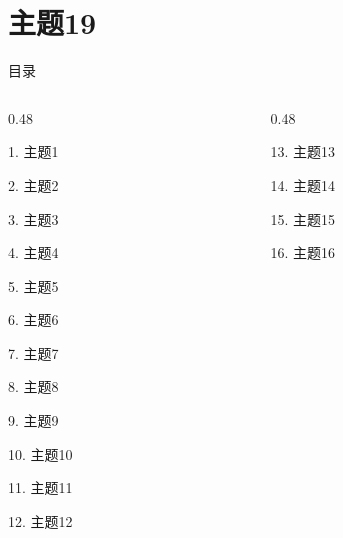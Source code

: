 \documentclass[aspectratio=169,10pt,fontset=fandol]{ctexbeamer}
\begin{document}
\section{主题19}
\begin{frame}[t,fragile]{目录}
\small
\begin{columns}[T,onlytextwidth]
\begin{column}{0.48\textwidth}
{\color{black}\small 1. 主题1\par}\vspace{0.22em}
{\color{black}\small 2. 主题2\par}\vspace{0.22em}
{\color{black}\small 3. 主题3\par}\vspace{0.22em}
{\color{black}\small 4. 主题4\par}\vspace{0.22em}
{\color{black}\small 5. 主题5\par}\vspace{0.22em}
{\color{black}\small 6. 主题6\par}\vspace{0.22em}
{\color{black}\small 7. 主题7\par}\vspace{0.22em}
{\color{black}\small 8. 主题8\par}\vspace{0.22em}
{\color{black}\small 9. 主题9\par}\vspace{0.22em}
{\color{black}\small 10. 主题10\par}\vspace{0.22em}
{\color{black}\small 11. 主题11\par}\vspace{0.22em}
{\color{black}\small 12. 主题12\par}\vspace{0.22em}
\end{column}
\begin{column}{0.48\textwidth}
{\color{black}\small 13. 主题13\par}\vspace{0.22em}
{\color{black}\small 14. 主题14\par}\vspace{0.22em}
{\color{black}\small 15. 主题15\par}\vspace{0.22em}
{\color{black}\small 16. 主题16\par}\vspace{0.22em}

\end{column}
\end{columns}
\end{frame}
\end{document}
